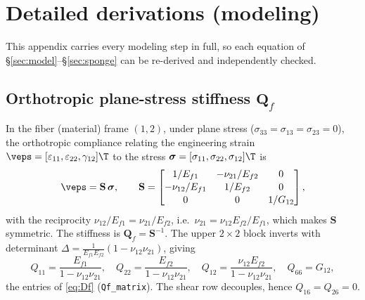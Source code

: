 \documentclass[11pt]{article}
\begin{document}
\section{Detailed derivations (modeling)}
\label{app:derivmodel}
This appendix carries every modeling step in full, so each equation of
\S\ref{sec:model}--\S\ref{sec:sponge} can be re-derived and independently checked.

\subsection{Orthotropic plane-stress stiffness $\mathbf Q_f$}
In the fiber (material) frame $(1,2)$, under plane stress
($\sigma_{33}=\sigma_{13}=\sigma_{23}=0$), the orthotropic compliance relating the
engineering strain $\veps=[\varepsilon_{11},\varepsilon_{22},\gamma_{12}]\T$ to the
stress $\bm\sigma=[\sigma_{11},\sigma_{22},\sigma_{12}]\T$ is
\begin{equation}
  \veps=\mathbf S\,\bm\sigma,\qquad
  \mathbf S=\begin{bmatrix} 1/E_{f1} & -\nu_{21}/E_{f2} & 0\\[1pt]
  -\nu_{12}/E_{f1} & 1/E_{f2} & 0\\[1pt] 0 & 0 & 1/G_{12}\end{bmatrix},
\end{equation}
with the reciprocity $\nu_{12}/E_{f1}=\nu_{21}/E_{f2}$, i.e.\
$\nu_{21}=\nu_{12}E_{f2}/E_{f1}$, which makes $\mathbf S$ symmetric. The stiffness
is $\mathbf Q_f=\mathbf S^{-1}$. The upper $2\times2$ block inverts with determinant
$\Delta=\tfrac{1}{E_{f1}E_{f2}}(1-\nu_{12}\nu_{21})$, giving
\begin{equation}
  Q_{11}=\frac{E_{f1}}{1-\nu_{12}\nu_{21}},\quad
  Q_{22}=\frac{E_{f2}}{1-\nu_{12}\nu_{21}},\quad
  Q_{12}=\frac{\nu_{12}E_{f2}}{1-\nu_{12}\nu_{21}},\quad Q_{66}=G_{12},
\end{equation}
the entries of \eqref{eq:Df} (\texttt{Qf\_matrix}). The shear row decouples, hence
$Q_{16}=Q_{26}=0$.
\end{document}
